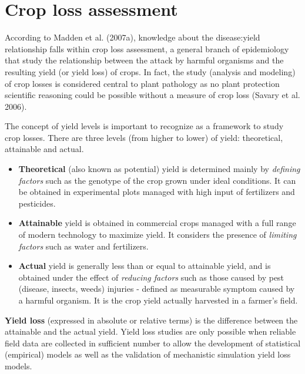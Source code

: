 \documentclass[
  letterpaper,
]{book}
\providecommand{\tightlist}{%
  \setlength{\itemsep}{0pt}\setlength{\parskip}{0pt}}\usepackage{longtable,booktabs,array}
\begin{document}
\hypertarget{crop-loss-assessment}{%
\section{Crop loss assessment}\label{crop-loss-assessment}}

According to Madden et al. (2007a), knowledge about the disease:yield
relationship falls within crop loss assessment, a general branch of
epidemiology that study the relationship between the attack by harmful
organisms and the resulting yield (or yield loss) of crops. In fact, the
study (analysis and modeling) of crop losses is considered central to
plant pathology as no plant protection scientific reasoning could be
possible without a measure of crop loss (Savary et al. 2006).

The concept of yield levels is important to recognize as a framework to
study crop losses. There are three levels (from higher to lower) of
yield: theoretical, attainable and actual.

\begin{itemize}
\tightlist
\item
  \textbf{Theoretical} (also known as potential) yield is determined
  mainly by \emph{defining factors} such as the genotype of the crop
  grown under ideal conditions. It can be obtained in experimental plots
  managed with high input of fertilizers and pesticides.
\item
  \textbf{Attainable} yield is obtained in commercial crops managed with
  a full range of modern technology to maximize yield. It considers the
  presence of \emph{limiting factors} such as water and fertilizers.
\item
  \textbf{Actual} yield is generally less than or equal to attainable
  yield, and is obtained under the effect of \emph{reducing factors}
  such as those caused by pest (disease, insects, weeds) injuries -
  defined as measurable symptom caused by a harmful organism. It is the
  crop yield actually harvested in a farmer's field.
\end{itemize}

\textbf{Yield loss} (expressed in absolute or relative terms) is the
difference between the attainable and the actual yield. Yield loss
studies are only possible when reliable field data are collected in
sufficient number to allow the development of statistical (empirical)
models as well as the validation of mechanistic simulation yield loss
models.
\end{document}
